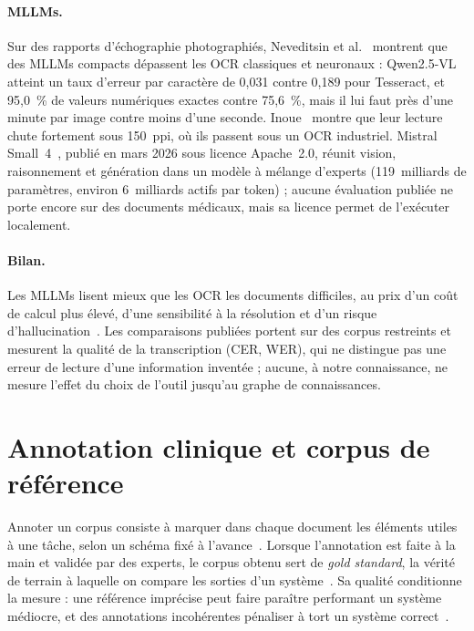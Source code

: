\paragraph{MLLMs.} Sur des rapports d'échographie photographiés, Neveditsin et al.~\cite{neveditsin2026compact} montrent que des MLLMs compacts dépassent les OCR classiques et neuronaux : Qwen2.5-VL atteint un taux d'erreur par caractère de 0,031 contre 0,189 pour Tesseract, et 95,0~\% de valeurs numériques exactes contre 75,6~\%, mais il lui faut près d'une minute par image contre moins d'une seconde. Inoue~\cite{inoue2025context} montre que leur lecture chute fortement sous 150~ppi, où ils passent sous un OCR industriel. Mistral Small~4~\cite{mistralsmall4}, publié en mars 2026 sous licence Apache~2.0, réunit vision, raisonnement et génération dans un modèle à mélange d'experts (119~milliards de paramètres, environ 6~milliards actifs par token) ; aucune évaluation publiée ne porte encore sur des documents médicaux, mais sa licence permet de l'exécuter localement.

\paragraph{Bilan.} Les MLLMs lisent mieux que les OCR les documents difficiles, au prix d'un coût de calcul plus élevé, d'une sensibilité à la résolution et d'un risque d'hallucination~\cite{bai2025survey}. Les comparaisons publiées portent sur des corpus restreints et mesurent la qualité de la transcription (CER, WER), qui ne distingue pas une erreur de lecture d'une information inventée ; aucune, à notre connaissance, ne mesure l'effet du choix de l'outil jusqu'au graphe de connaissances.

\section{Annotation clinique et corpus de référence}\label{sec:c2-annotation}

Annoter un corpus consiste à marquer dans chaque document les éléments utiles à une tâche, selon un schéma fixé à l'avance~\cite{pustejovsky2012natural}. Lorsque l'annotation est faite à la main et validée par des experts, le corpus obtenu sert de \textit{gold standard}, la vérité de terrain à laquelle on compare les sorties d'un système~\cite{deleger2012building}. Sa qualité conditionne la mesure : une référence imprécise peut faire paraître performant un système médiocre, et des annotations incohérentes pénaliser à tort un système correct~\cite{hripcsak2005agreement}.

